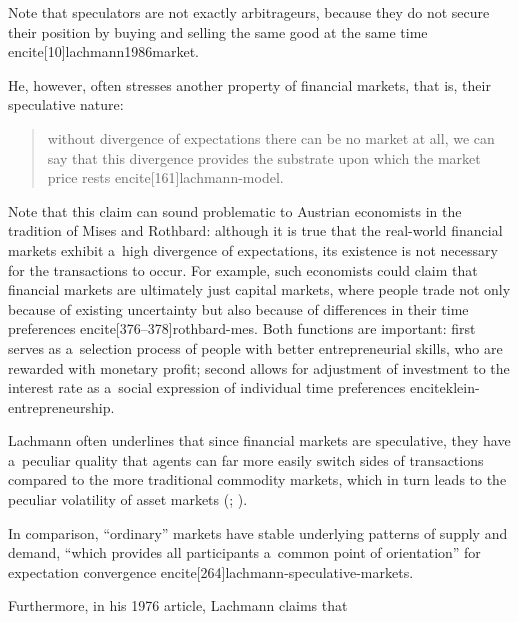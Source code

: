 {Note that speculators are not exactly arbitrageurs, because they do not secure their position by buying and selling the same good at the same time encite[10]{lachmann1986market}.



He, however, often stresses another property of financial markets, that is, their speculative nature:

\begin{quote}

without divergence of expectations there can be no market at all, we can say that this divergence provides the substrate upon which the market price rests encite[161]{lachmann-model}.

\end{quote}

Note that this claim can sound problematic to Austrian economists in the tradition of Mises and Rothbard: although it is true that the real-world financial markets exhibit a~high divergence of expectations, its existence is not necessary for the transactions to occur. For example, such economists could claim that financial markets are ultimately just capital markets, where people trade not only because of existing uncertainty but also because of differences in their time preferences encite[376--378]{rothbard-mes}. Both functions are important: first serves as a~selection process of people with better entrepreneurial skills, who are rewarded with monetary profit; second allows for adjustment of investment to the interest rate as a~social expression of individual time preferences encite{klein-entrepreneurship}.



Lachmann often underlines that since financial markets are speculative, they have a~peculiar quality that agents can far more easily switch sides of transactions compared to the more traditional commodity markets, which in turn leads to the peculiar volatility of asset markets (\cite[42]{lachmann1986market}; \citeyear[267]{lachmann-speculative-markets}).

In comparison, ``ordinary'' markets have stable underlying patterns of supply and demand, ``which provides all participants a~common point of orientation'' for expectation convergence encite[264]{lachmann-speculative-markets}.

Furthermore, in his 1976 article, Lachmann claims that

\begin{quote}


\end{quote}}
